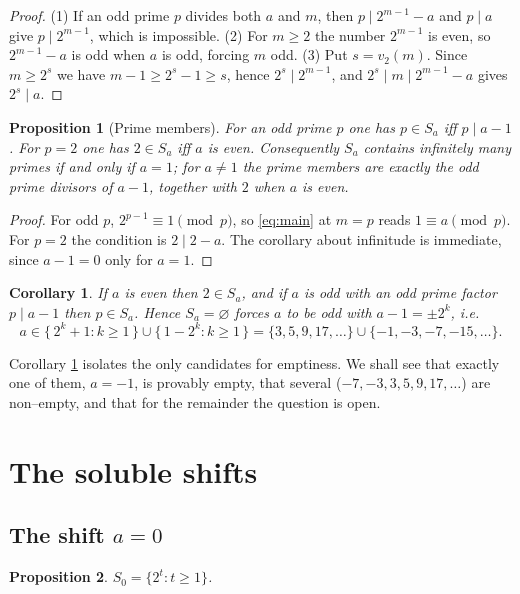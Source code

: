 \documentclass[11pt,reqno]{amsart}
\theoremstyle{plain}
\newtheorem{proposition}{Proposition}
\newtheorem{corollary}{Corollary}
\theoremstyle{definition}
\theoremstyle{remark}
\newcommand{\dvd}{\mid}
\newcommand{\Sa}{S_a}
\begin{document}
\begin{proof}
(1) If an odd prime $p$ divides both $a$ and $m$, then $p\dvd 2^{m-1}-a$ and $p\dvd a$ give $p\dvd2^{m-1}$, which is impossible. (2) For $m\ge2$ the number $2^{m-1}$ is even, so $2^{m-1}-a$ is odd when $a$ is odd, forcing $m$ odd. (3) Put $s=v_2(m)$. Since $m\ge 2^{s}$ we have $m-1\ge 2^{s}-1\ge s$, hence $2^{s}\dvd2^{m-1}$, and $2^{s}\dvd m\dvd 2^{m-1}-a$ gives $2^{s}\dvd a$.
\end{proof}

\begin{proposition}[Prime members]\label{prop:primes}
For an odd prime $p$ one has $p\in\Sa$ iff $p\dvd a-1$. For $p=2$ one has $2\in\Sa$ iff $a$ is even. Consequently $\Sa$ contains infinitely many primes if and only if $a=1$; for $a\ne1$ the prime members are exactly the odd prime divisors of $a-1$, together with $2$ when $a$ is even.
\end{proposition}

\begin{proof}
For odd $p$, $2^{p-1}\equiv1\pmod p$, so \eqref{eq:main} at $m=p$ reads $1\equiv a\pmod p$. For $p=2$ the condition is $2\dvd 2-a$. The corollary about infinitude is immediate, since $a-1=0$ only for $a=1$.
\end{proof}

\begin{corollary}\label{cor:nonempty}
If $a$ is even then $2\in\Sa$, and if $a$ is odd with an odd prime factor $p\dvd a-1$ then $p\in\Sa$. Hence $\Sa=\varnothing$ forces $a$ to be odd with $a-1=\pm2^{k}$, i.e.
\[
a\in\{\,2^{k}+1:k\ge1\,\}\cup\{\,1-2^{k}:k\ge1\,\}=\{3,5,9,17,\dots\}\cup\{-1,-3,-7,-15,\dots\}.
\]
\end{corollary}

Corollary \ref{cor:nonempty} isolates the only candidates for emptiness. We shall see that exactly one of them, $a=-1$, is provably empty, that several ($-7,-3,3,5,9,17,\dots$) are non--empty, and that for the remainder the question is open.

\section{The soluble shifts}\label{sec:soluble}

\subsection{The shift $a=0$}

\begin{proposition}\label{prop:zero}
$S_0=\{2^{t}:t\ge1\}$.
\end{proposition}
\end{document}
